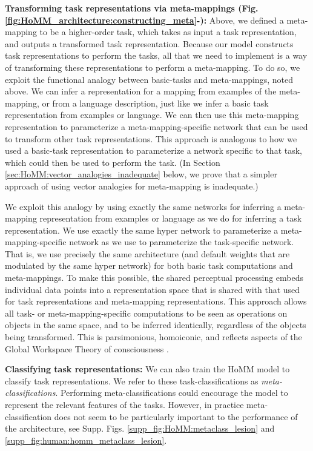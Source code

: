 \textbf{Transforming task representations via meta-mappings (Fig. \ref{fig:HoMM_architecture:constructing_meta}-):} Above, we defined a meta-mapping to be a higher-order task, which takes as input a task representation, and outputs a transformed task representation. Because our model constructs task representations to perform the tasks, all that we need to implement is a way of transforming these representations to perform a meta-mapping. To do so, we exploit the functional analogy between basic-tasks and meta-mappings, noted above. We can infer a representation for a mapping from examples of the meta-mapping, or from a language description, just like we infer a basic task representation from examples or language. We can then use this meta-mapping representation to parameterize a meta-mapping-specific network that can be used to transform other task representations. This approach is analogous to how we used a basic-task representation to parameterize a network specific to that task, which could then be used to perform the task. (In Section \ref{sec:HoMM:vector_analogies_inadequate} below, we prove that a simpler approach of using vector analogies for meta-mapping is inadequate.) 

We exploit this analogy by using exactly the same networks for inferring a meta-mapping representation from examples or language as we do for inferring a task representation. We use exactly the same hyper network to parameterize a meta-mapping-specific network as we use to parameterize the task-specific network. That is, we use precisely the same architecture (and default weights that are modulated by the same hyper network) for both basic task computations and meta-mappings. To make this possible, the shared perceptual processing embeds individual data points into a representation space that is shared with that used for task representations and meta-mapping representations. This approach allows all task- or meta-mapping-specific computations to be seen as operations on objects in the same space, and to be inferred identically, regardless of the objects being transformed. This is parsimonious, homoiconic, and reflects aspects of the Global Workspace Theory of consciousness \citep{Baars2005}.   

\textbf{Classifying task representations:} We can also train the HoMM model to classify task representations. We refer to these task-classifications as \emph{meta-classifications}. Performing meta-classifications could encourage the model to represent the relevant features of the tasks. However, in practice meta-classification does not seem to be particularly important to the performance of the architecture, see Supp. Figs. \ref{supp_fig:HoMM:metaclass_lesion} and \ref{supp_fig:human:homm_metaclass_lesion}.


